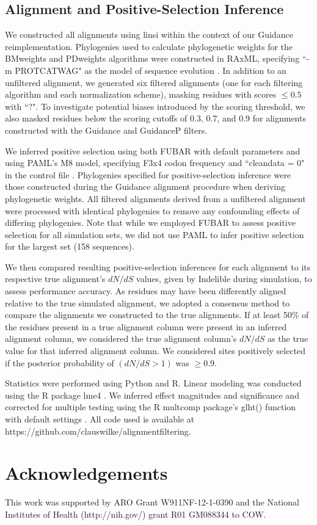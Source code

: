 \documentclass[11pt]{article}
\begin{document}
\subsection*{Alignment and Positive-Selection Inference}

We constructed all alignments using linsi \citep{Katoh2002,Katoh2005} within the context of our Guidance reimplementation. Phylogenies used to calculate phylogenetic weights for the BMweights and PDweights algorithms were constructed in RAxML, specifying ``-m PROTCATWAG" as the model of sequence evolution \citep{Stamatakis2006,Stamatakis2006C}. In addition to an unfiltered alignment, we generated six filtered alignments (one for each filtering algorithm and each normalization scheme), masking residues with scores $\leq0.5$ with ``?". To investigate potential biases introduced by the scoring threshold, we also masked residues below the scoring cutoffs of 0.3, 0.7, and 0.9 for alignments constructed with the Guidance and GuidanceP filters.

We inferred positive selection using both FUBAR \citep{Murrell2013} with default parameters and using PAML's M8 model, specifying F3x4 codon frequency and ``cleandata = 0" in the control file \citep{Yang2007}. Phylogenies specified for positive-selection inference were those constructed during the Guidance alignment procedure when deriving phylogenetic weights. All filtered alignments derived from a unfiltered alignment were processed with identical phylogenies to remove any confounding effects of differing phylogenies. Note that while we employed FUBAR to assess positive selection for all simulation sets, we did not use PAML to infer positive selection for the largest set (158 sequences).

We then compared resulting positive-selection inferences for each alignment to its respective true alignment's $dN/dS$ values, given by Indelible during simulation, to assess performance accuracy. As residues may have been differently aligned relative to the true simulated alignment, we adopted a consensus method to compare the alignments we constructed to the true alignments. If at least 50\% of the residues present in a true alignment column were present in an inferred alignment column, we considered the true alignment column's $dN/dS$ as the true value for that inferred alignment column. We considered sites positively selected if the posterior probability of $(dN/dS>1)$ was $\geq0.9$.

Statistics were performed using Python and R. Linear modeling was conducted using the R package lme4 \citep{Bates2012}. We inferred effect magnitudes and significance and corrected for multiple testing using the R multcomp package's glht() function with default settings \citep{Hothorn2008}. All code used is available at https://github.com/clauswilke/alignment\underline{\hspace*{0.2cm}}filtering.


\section*{Acknowledgements}
This work was supported by ARO Grant W911NF-12-1-0390 and the National Institutes of Health (http://nih.gov/) grant R01 GM088344 to COW.


	
\end{document}
